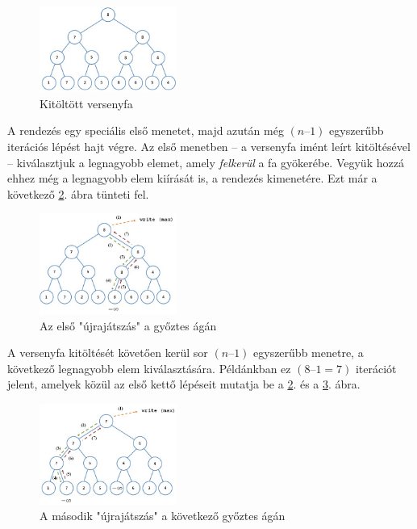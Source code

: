 \documentclass[12pt,margin=0px]{article}
\begin{document}
	\begin{figure}[H]
		\centering
		\includegraphics[width=0.4\textwidth]{img/tournament_fill1.png}
		\caption{Kitöltött versenyfa}
        \label{fig:tournament_fill1}
	\end{figure}	

    \noindent A rendezés egy speciális első menetet, majd azután még $(n – 1)$ egyszerűbb iterációs lépést hajt végre. Az első menetben – a versenyfa imént leírt kitöltésével – kiválasztjuk a legnagyobb elemet, amely \emph{felkerül} a fa gyökerébe. Vegyük hozzá ehhez még a legnagyobb elem kiírását is, a rendezés kimenetére. Ezt már a következő \ref{fig:tournament_max}. ábra tünteti fel.

	\begin{figure}[H]
		\centering
		\includegraphics[width=0.4\textwidth]{img/tournament_max.png}
		\caption{Az első "újrajátszás" a győztes ágán}
        \label{fig:tournament_max}
	\end{figure}	

    \noindent A versenyfa kitöltését követően kerül sor $(n – 1)$ egyszerűbb menetre, a következő legnagyobb elem kiválasztására. Példánkban ez $(8 – 1 = 7)$ iterációt jelent, amelyek közül az első kettő lépéseit mutatja be a \ref{fig:tournament_max}. és a \ref{fig:tournament_max2}. ábra.\\

	\begin{figure}[H]
		\centering
		\includegraphics[width=0.4\textwidth]{img/tournament_max2.png}
		\caption{A második "újrajátszás" a következő győztes ágán}
        \label{fig:tournament_max2}
	\end{figure}
\end{document}
